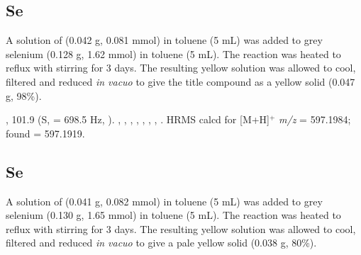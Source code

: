 \subsection*{\tBuThixantphos{}Se}

A solution of \tButhixantphos{} (0.042 g, 0.081 mmol) in toluene (5 mL) was added to grey selenium (0.128 g, 1.62 mmol) in toluene (5 mL).  The reaction was heated to reflux with stirring for 3 days.  The resulting yellow solution was allowed to cool, filtered and reduced \emph{in vacuo} to give the title compound as a yellow solid (0.047 g, 98\%).   

,
101.9 (S, \JPSe{} = 698.5 Hz, ).
,
,
,
,
,
,
,
.
HRMS calcd for  [M+H]$^+$ \emph{m/z} = 597.1984; found = 597.1919.


\subsection*{\tBuXantphos{}Se}


A solution of \tBuxantphos{} (0.041 g, 0.082 mmol) in toluene (5 mL) was added to grey selenium (0.130 g, 1.65 mmol) in toluene (5 mL).  The reaction was heated to reflux with stirring for 3 days.  The resulting yellow solution was allowed to cool, filtered and reduced \emph{in vacuo} to give a pale yellow solid (0.038 g, 80\%).    

